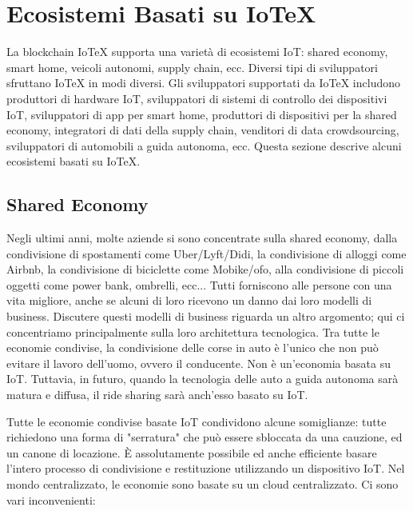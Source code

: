 \section{Ecosistemi Basati su IoTeX}

La blockchain IoTeX supporta una varietà di ecosistemi IoT: shared economy, smart home, veicoli autonomi, supply chain, ecc. Diversi tipi di sviluppatori
sfruttano IoTeX in modi diversi. Gli sviluppatori supportati da IoTeX includono produttori di hardware IoT, sviluppatori di sistemi di controllo dei dispositivi IoT, sviluppatori di app per smart home, produttori di dispositivi per la shared economy, integratori di dati della supply chain, venditori di data crowdsourcing, sviluppatori di automobili a guida autonoma, ecc. Questa sezione descrive alcuni ecosistemi basati su IoTeX.

\subsection{Shared Economy}
Negli ultimi anni, molte aziende si sono concentrate sulla shared economy, dalla condivisione di spostamenti come Uber/Lyft/Didi, la condivisione di alloggi come Airbnb, la condivisione di biciclette come Mobike/ofo, alla condivisione di piccoli oggetti come power bank, ombrelli, ecc... Tutti forniscono
alle persone con una vita migliore, anche se alcuni di loro ricevono un danno dai loro modelli di business. Discutere questi modelli di business riguarda un altro argomento; qui ci concentriamo principalmente sulla loro architettura tecnologica. Tra tutte le economie condivise, la condivisione delle corse in auto è l'unico che non può evitare il lavoro dell'uomo, ovvero il conducente. Non è un'economia basata su IoT. Tuttavia, in futuro, quando la tecnologia delle auto a guida autonoma sarà matura e diffusa, il ride sharing sarà anch'esso basato su IoT.

Tutte le economie condivise basate IoT condividono alcune somiglianze: tutte richiedono una forma di "serratura" che può essere sbloccata da una cauzione, ed un canone di locazione. È assolutamente possibile ed anche efficiente basare l'intero processo di condivisione e restituzione utilizzando un dispositivo IoT. Nel mondo centralizzato, le economie sono basate su un cloud centralizzato. Ci sono vari inconvenienti:

